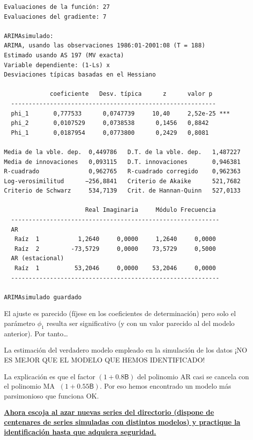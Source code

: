 \documentclass[10pt]{article}
\begin{document}
\begin{verbatim}
Evaluaciones de la función: 27
Evaluaciones del gradiente: 7

ARIMAsimulado:
ARIMA, usando las observaciones 1986:01-2001:08 (T = 188)
Estimado usando AS 197 (MV exacta)
Variable dependiente: (1-Ls) x
Desviaciones típicas basadas en el Hessiano

             coeficiente   Desv. típica      z      valor p 
  ----------------------------------------------------------
  phi_1       0,777533      0,0747739     10,40     2,52e-25 ***
  phi_2       0,0107529     0,0738538      0,1456   0,8842  
  Phi_1       0,0187954     0,0773800      0,2429   0,8081  

Media de la vble. dep.  0,449786   D.T. de la vble. dep.   1,487227
Media de innovaciones   0,093115   D.T. innovaciones       0,946381
R-cuadrado              0,962765   R-cuadrado corregido    0,962363
Log-verosimilitud      −256,8841   Criterio de Akaike      521,7682
Criterio de Schwarz     534,7139   Crit. de Hannan-Quinn   527,0133

                       Real Imaginaria     Módulo Frecuencia
  -----------------------------------------------------------
  AR
   Raíz  1           1,2640     0,0000     1,2640     0,0000
   Raíz  2         -73,5729     0,0000    73,5729     0,5000
  AR (estacional)
   Raíz  1          53,2046     0,0000    53,2046     0,0000
  -----------------------------------------------------------

ARIMAsimulado guardado
\end{verbatim}

El ajuste es parecido (fíjese en los coeficientes de determinación)
pero solo el parámetro \(\phi_1\) resulta ser significativo (y con un
valor parecido al del modelo anterior). Por tanto\ldots{}
\bigskip

La estimación del verdadero modelo empleado en la simulación de los
datos ¡NO ES MEJOR QUE EL MODELO QUE HEMOS IDENTIFICADO!

La explicación es que el factor \((1 + 0.8\mathsf{B})\) del polinomio AR
casi se cancela con el polinomio MA \(\;(1 + 0.55\mathsf{B})\). Por eso
hemos encontrado un modelo más parsimonioso que funciona OK.
\bigskip


\textbf{\uline{Ahora escoja al azar nuevas series del \href{https://github.com/mbujosab/EconometriaAplicada-SRC/tree/main/Ejercicios/IdentificaEstosARIMA}{directorio} (dispone de
 centenares de series simuladas con distintos modelos) y practique la
 identificación hasta que adquiera seguridad.}}
\end{document}
